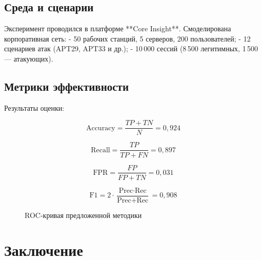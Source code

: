 \documentclass[12pt,a4paper]{article}
\begin{document}
\subsection{Среда и сценарии}

Эксперимент проводился в платформе **Core Insight**. Смоделирована корпоративная сеть:
- 50 рабочих станций, 5 серверов, 200 пользователей;
- 12 сценариев атак (APT29, APT33 и др.);
- 10\,000 сессий (8\,500 легитимных, 1\,500 — атакующих).

\subsection{Метрики эффективности}

Результаты оценки:

\begin{equation}
\text{Accuracy} = \frac{TP + TN}{N} = 0{,}924
\end{equation}

\begin{equation}
\text{Recall} = \frac{TP}{TP + FN} = 0{,}897
\end{equation}

\begin{equation}
\text{FPR} = \frac{FP}{FP + TN} = 0{,}031
\end{equation}

\begin{equation}
\text{F1} = 2 \cdot \frac{\text{Prec} \cdot \text{Rec}}{\text{Prec} + \text{Rec}} = 0{,}908
\end{equation}

\begin{figure}[ht]
\centering
{}
\caption{ROC-кривая предложенной методики}
\label{fig:roc}
\end{figure}

\section{Заключение}
\end{document}

